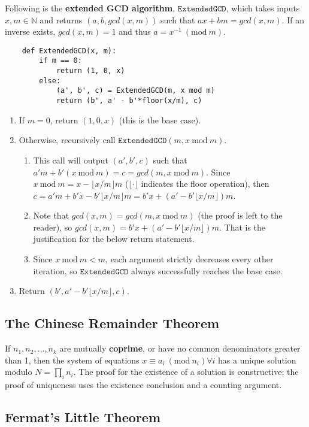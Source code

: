 \documentclass[12pt]{article}
\begin{document}
Following is the \textbf{extended GCD algorithm}, $\mathtt{ExtendedGCD}$, which takes inputs $x, m \in \mathbb N$ and returns $(a, b, gcd(x, m))$ such that $ax + bm = gcd(x, m)$. If an inverse exists, $gcd(x, m) = 1$ and thus $a = x^{-1}\ (\mathrm{mod}\ m)$.
\begin{verbatim}
    def ExtendedGCD(x, m):
        if m == 0:
            return (1, 0, x)
        else:
            (a', b', c) = ExtendedGCD(m, x mod m)
            return (b', a' - b'*floor(x/m), c)
\end{verbatim}
\begin{enumerate}
\item If $m = 0$, return $(1, 0, x)$ (this is the base case).
\item Otherwise, recursively call $\mathtt{ExtendedGCD}(m, x\ \mathrm{mod}\ m)$.
\begin{enumerate}
\item This call will output $(a', b', c)$ such that $a'm + b'(x\ \mathrm{mod}\ m) = c = gcd(m, x\ \mathrm{mod}\ m)$. Since $x\ \mathrm{mod}\ m = x - \lfloor x/m \rfloor m$ ($\lfloor \cdot \rfloor$ indicates the floor operation), then $c = a'm + b'x - b'\lfloor x/m \rfloor m = b'x + (a' - b'\lfloor x/m \rfloor)m$.
\item Note that $gcd(x, m) = gcd(m, x\ \mathrm{mod}\ m)$ (the proof is left to the reader), so $gcd(x, m) = b'x + (a' - b'\lfloor x/m \rfloor)m$. That is the justification for the below return statement.
\item Since $x\ \mathrm{mod}\ m < m$, each argument strictly decreases every other iteration, so $\mathtt{ExtendedGCD}$ always successfully reaches the base case.
\end{enumerate}
\item Return $(b', a' - b'\lfloor x/m \rfloor, c)$.
\end{enumerate}

\subsection{The Chinese Remainder Theorem}

If $n_1, n_2, \ldots, n_k$ are mutually \textbf{coprime}, or have no common denominators greater than 1, then the system of equations $x \equiv a_i\ (\mathrm{mod}\ n_i) \forall i$ has a unique solution modulo $N = \prod_i n_i$. The proof for the existence of a solution is constructive; the proof of uniqueness uses the existence conclusion and a counting argument.

\subsection{Fermat's Little Theorem}
\end{document}
